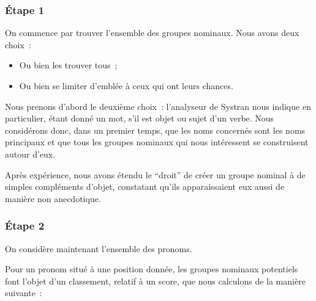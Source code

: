 \documentclass[a4paper, 12pt]{article}
\begin{document}
\subsubsection{Étape 1}
On commence par trouver l'ensemble des groupes nominaux. Nous avons deux choix~:
\begin{itemize}
 \item Ou bien les trouver tous~;
 \item Ou bien se limiter d'emblée à ceux qui ont leurs chances.
\end{itemize}

Nous prenons d'abord le deuxième choix~: l'analyseur de Systran nous indique en particulier, étant donné un mot, s'il est objet ou sujet d'un verbe. Nous considérons donc, dans un premier temps, que les noms concernés sont les noms principaux et que tous les groupes nominaux qui nous intéressent se construisent autour d'eux.

Après expérience, nous avons étendu le ``droit'' de créer un groupe nominal à de simples compléments d'objet, constatant qu'ils apparaissaient eux aussi de manière non anecdotique.


\subsubsection{Étape 2}
On considère maintenant l'ensemble des pronoms.

Pour un pronom situé à une position donnée, les groupes nominaux potentiels font l'objet d'un classement, relatif à un score, que nous calculons de la manière suivante~:
\end{document}
